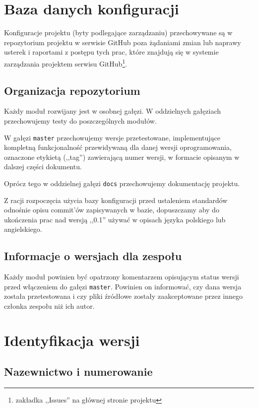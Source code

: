 \documentclass[a4paper]{article}
\begin{document}
\section{Baza danych konfiguracji}

Konfiguracje projektu (byty podlegające zarządzaniu) przechowywane są w repozytorium projektu w serwisie GitHub poza żądaniami zmian lub naprawy usterek i raportami z postępu tych prac, które znajdują się w systemie zarządzania projektem serwisu GitHub\footnote{zakładka ,,Issues'' na głównej stronie projektu}.

\subsection{Organizacja repozytorium}
 
Każdy moduł rozwijany jest w osobnej gałęzi. W oddzielnych gałęziach przechowujemy testy do poszczególnych modułów.

W gałęzi \verb+master+ przechowujemy wersje przetestowane, implementujące kompletną funkcjonalność przewidywaną dla danej wersji oprogramowania, oznaczone etykietą (,,tag'') zawierającą numer wersji, w formacie opisanym w dalszej części dokumentu.

Oprócz tego w oddzielnej gałęzi \verb+docs+ przechowujemy dokumentację projektu.

Z racji rozpoczęcia użycia bazy konfiguracji przed ustaleniem standardów odnośnie opisu commit'ów zapisywanych w bazie, dopuszczamy aby do ukończenia prac nad wersją ,,0.1'' używać w opisach języka polskiego lub angielskiego.

\subsection{Informacje o wersjach dla zespołu}

Każdy moduł powinien  być opatrzony komentarzem opisującym status wersji przed włączeniem do gałęzi \verb+master+. Powinien on informować, czy dana wersja została przetestowana i czy pliki źródłowe zostały zaakceptowane przez innego członka zespołu niż ich autor.

\section{Identyfikacja wersji}

\subsection{Nazewnictwo i numerowanie}
\end{document}
